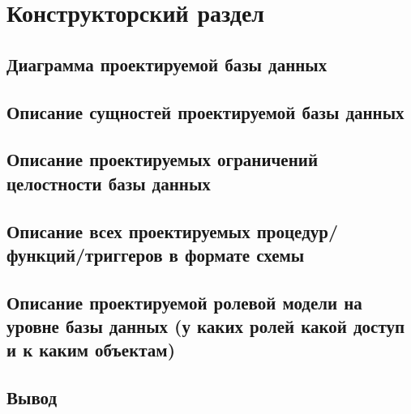 \chapter{Конструкторский раздел}

\section{Диаграмма проектируемой базы данных}

\section{Описание сущностей проектируемой базы данных}

\section{Описание проектируемых ограничений целостности базы данных}

\section{Описание всех проектируемых процедур/функций/триггеров в формате схемы}

\section{Описание проектируемой ролевой модели на уровне базы данных (у каких ролей какой
доступ и к каким объектам)}

\section*{Вывод}